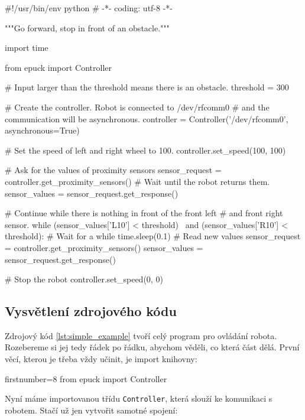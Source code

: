 \begin{mylisting}
\begin{pyc}
#!/usr/bin/env python
# -*- coding: utf-8 -*-

"""Go forward, stop in front of an obstacle."""

import time

from epuck import Controller

# Input larger than the threshold means there is an obstacle.
threshold = 300

# Create the controller. Robot is connected to /dev/rfcomm0
# and the communication will be asynchronous.
controller = Controller('/dev/rfcomm0', asynchronous=True)

# Set the speed of left and right wheel to 100.
controller.set_speed(100, 100)

# Ask for the values of proximity sensors
sensor_request = controller.get_proximity_sensors()
# Wait until the robot returns them.
sensor_values = sensor_request.get_response()

# Continue while there is nothing in front of the front left
# and front right sensor.
while (sensor_values['L10'] < threshold) \
       and (sensor_values['R10'] < threshold):
    # Wait for a while
    time.sleep(0.1)
    # Read new values
    sensor_request = controller.get_proximity_sensors()
    sensor_values = sensor_request.get_response()

# Stop the robot
controller.set_speed(0, 0)
\end{pyc}
\label{lst:simple_example}
\end{mylisting}

\subsection{Vysvětlení zdrojového kódu}

    Zdrojový kód \ref{lst:simple_example} tvoří celý program pro ovládání
    robota. Rozebereme si jej tedy řádek po řádku, abychom věděli, co která
    část dělá. První věcí, kterou je třeba vždy učinit, je import knihovny:

    \begin{pyc*}{firstnumber=8}
from epuck import Controller
    \end{pyc*}

    Nyní máme importovanou třídu {\tt Controller}, která slouží ke komunikaci s
    robotem. Stačí už jen vytvořit samotné spojení:

